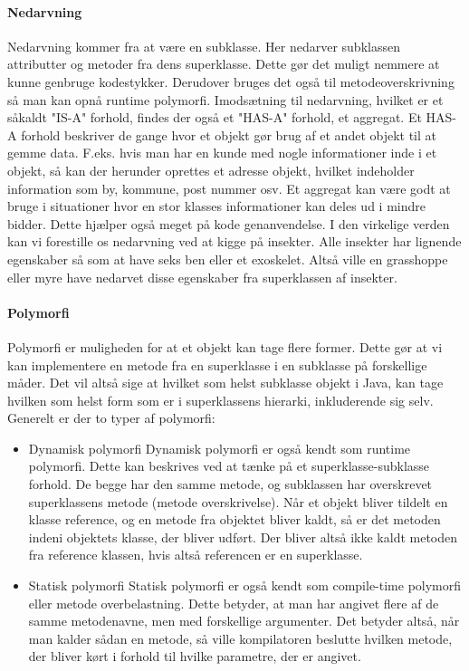     \paragraph{Nedarvning} 
    Nedarvning kommer fra at være en subklasse. Her nedarver subklassen attributter og metoder fra dens superklasse. Dette gør det muligt nemmere at kunne genbruge kodestykker. Derudover bruges det også til metodeoverskrivning så man kan opnå runtime polymorfi. 
    Imodsætning til nedarvning, hvilket er et såkaldt "IS-A" forhold, findes der også et "HAS-A" forhold, et aggregat.
    Et HAS-A forhold beskriver de gange hvor et objekt gør brug af et andet objekt til at gemme data. F.eks. hvis man har en kunde med nogle informationer inde i et objekt, så kan der herunder oprettes et adresse objekt, hvilket indeholder information som by, kommune, post nummer osv. 
    Et aggregat kan være godt at bruge i situationer hvor en stor klasses informationer kan deles ud i mindre bidder. Dette hjælper også meget på kode genanvendelse.
    I den virkelige verden kan vi forestille os nedarvning ved at kigge på insekter. Alle insekter har lignende egenskaber så som at have seks ben eller et exoskelet. Altså ville en grasshoppe eller myre have nedarvet disse egenskaber fra superklassen af insekter.
    \paragraph{Polymorfi} 
    Polymorfi er muligheden for at et objekt kan tage flere former. Dette gør at vi kan implementere en metode fra en superklasse i en subklasse på forskellige måder. 
    Det vil altså sige at hvilket som helst subklasse objekt i Java, kan tage hvilken som helst form som er i superklassens hierarki, inkluderende sig selv.
    Generelt er der to typer af polymorfi:
    \begin{itemize}
        \item Dynamisk polymorfi 
        \subitem 
        Dynamisk polymorfi er også kendt som runtime polymorfi. Dette kan beskrives ved at tænke på et superklasse-subklasse forhold. De begge har den samme metode, og subklassen har overskrevet superklassens metode (metode overskrivelse).
        Når et objekt bliver tildelt en klasse reference, og en metode fra objektet bliver kaldt, så er det metoden indeni objektets klasse, der bliver udført. Der bliver altså ikke kaldt metoden fra reference klassen, hvis altså referencen er en superklasse. %
        \item Statisk polymorfi 
        \subitem Statisk polymorfi er  også kendt som compile-time polymorfi eller metode overbelastning. Dette betyder, at man har angivet flere af de samme metodenavne, men med forskellige argumenter. Det betyder altså, når man kalder sådan en metode, så ville kompilatoren beslutte hvilken metode, der bliver kørt i forhold til hvilke parametre, der er angivet.
    \end{itemize}
    
